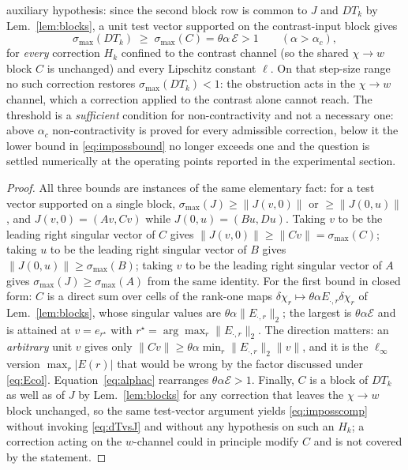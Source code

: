 \documentclass[journal,cmes,article,submit,moreauthors,pdftex]{Definitions/tsp}
\newcommand{\norm}[1]{\lVert #1 \rVert}
\begin{document}
\begin{Proposition}
auxiliary hypothesis: since the second block row is common to $J$ and $DT_k$ by Lem.~\ref{lem:blocks}, a unit test vector supported on the contrast-input block gives
\begin{equation}\label{eq:imposscomp}
\sigma_{\max}(DT_k)\;\ge\;\sigma_{\max}(C)=\theta\alpha\,\mathcal{E}>1
\qquad(\alpha>\alpha_c),
\end{equation}
for \emph{every} correction $H_k$ confined to the contrast channel (so the shared
$\chi\!\to\!w$ block $C$ is unchanged) and every Lipschitz constant $\ell$. On that step-size range no
such correction restores $\sigma_{\max}(DT_k)<1$: the obstruction acts in the
$\chi\!\to\!w$ channel, which a correction applied to the contrast alone cannot reach. The
threshold is a \emph{sufficient} condition for non-contractivity and not a necessary one: above
$\alpha_c$ non-contractivity is proved for every admissible correction, below it the lower bound
in \eqref{eq:impossbound} no longer exceeds one and the question is settled numerically at the
operating points reported in the experimental section.
\end{Proposition}
\begin{proof}
All three bounds are instances of the same elementary fact: for a test vector supported on a single
block, $\sigma_{\max}(J)\ge\norm{J(v,0)}$ or $\ge\norm{J(0,u)}$, and
$J(v,0)=(Av,Cv)$ while $J(0,u)=(Bu,Du)$. Taking $v$ to be the leading right singular vector of $C$
gives $\norm{J(v,0)}\ge\norm{Cv}=\sigma_{\max}(C)$; taking $u$ to be the leading right singular
vector of $B$ gives $\norm{J(0,u)}\ge\sigma_{\max}(B)$; taking $v$ to be the leading right singular
vector of $A$ gives $\sigma_{\max}(J)\ge\sigma_{\max}(A)$ from the same identity. For the first
bound in closed form: $C$ is a direct sum over cells of the rank-one maps
$\delta\chi_r\mapsto\theta\alpha E_{\cdot,r}\delta\chi_r$ of Lem.~\ref{lem:blocks}, whose singular
values are $\theta\alpha\norm{E_{\cdot,r}}_2$; the largest is $\theta\alpha\mathcal{E}$ and is
attained at $v=e_{r^\star}$ with $r^\star=\arg\max_r\norm{E_{\cdot,r}}_2$. The direction matters: an \emph{arbitrary} unit $v$ gives only
$\norm{Cv}\ge\theta\alpha\min_r\norm{E_{\cdot,r}}_2\norm{v}$, and it is the $\ell_\infty$ version
$\max_r|E(r)|$ that would be wrong by the factor discussed under \eqref{eq:Ecol}.
Equation~\eqref{eq:alphac} rearranges $\theta\alpha\mathcal{E}>1$. Finally, $C$ is a block of
$DT_k$ as well as of $J$ by Lem.~\ref{lem:blocks} for any correction that leaves the $\chi\!\to\!w$
block unchanged, so the same test-vector argument yields
\eqref{eq:imposscomp} without invoking \eqref{eq:dTvsJ} and without any hypothesis on such an $H_k$;
a correction acting on the $w$-channel could in principle modify $C$ and is not covered by the
statement.
\end{proof}
\end{document}
